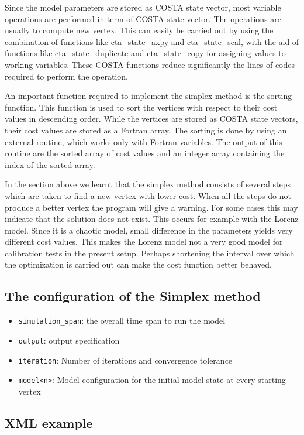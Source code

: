 Since the model parameters are stored as COSTA state vector, most variable
operations are performed in term of COSTA state vector. The operations are
usually to compute new vertex. This can easily be carried out by using the
combination of functions like cta\_state\_axpy and cta\_state\_scal, with
the aid of functions like cta\_state\_duplicate and cta\_state\_copy for
assigning values to working variables. These COSTA functions reduce
significantly the lines of codes required to perform the operation.

An important function required to implement the simplex method is the sorting
function. This function is used to sort the vertices with respect to their
cost values in descending order. While the vertices are stored as COSTA
state vectors, their cost values are stored as a Fortran array. The sorting
is done by using an external routine, which works only with Fortran
variables. The output of this routine are the sorted array of cost values
and an integer array containing the index of the sorted array.

In the section above  we learnt that the simplex method consists
of several steps which are taken to find a new vertex with lower cost. When
all the steps do not produce a better vertex the program will give a
warning. For some cases this may indicate that the solution does not exist.
This occurs for example with the Lorenz model. Since it is a chaotic model,
small difference in the parameters yields very different cost values. This
makes the Lorenz model not a very good model for calibration tests in the
present setup. Perhaps shortening the interval over which the optimization
is carried out can make the cost function better behaved.
\subsection{The configuration of the Simplex method}
\begin{itemize}
\item {\tt simulation\_span}: the overall time span to run the model
\item {\tt output}: output specification
\item {\tt iteration}: Number of iterations and convergence tolerance
\item {\tt model<n>}: Model configuration for the initial model state at every
starting vertex
\end{itemize}

\subsection{XML example}

